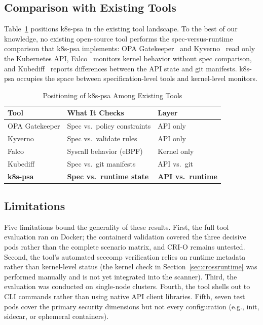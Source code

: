 \documentclass[sigconf]{acmart}
\begin{document}
\subsection{Comparison with Existing Tools}

Table~\ref{tab:tools} positions k8s-psa in the existing tool landscape. To the best of our knowledge, no existing open-source tool performs the spec-versus-runtime comparison that k8s-psa implements: OPA Gatekeeper~\cite{gatekeeper2024} and Kyverno~\cite{kyverno2024} read only the Kubernetes API, Falco~\cite{falco2024} monitors kernel behavior without spec comparison, and Kubediff~\cite{kubediff2020} reports differences between the API state and git manifests. k8s-psa occupies the space between specification-level tools and kernel-level monitors.

\begin{table}[htbp]
\caption{Positioning of k8s-psa Among Existing Tools}
\label{tab:tools}
\centering
\begin{tabular}{lll}
\toprule
\textbf{Tool} & \textbf{What It Checks} & \textbf{Layer} \\
\midrule
OPA Gatekeeper & Spec vs.\ policy constraints & API only \\
Kyverno        & Spec vs.\ validate rules & API only \\
Falco          & Syscall behavior (eBPF) & Kernel only \\
Kubediff       & Spec vs.\ git manifests & API vs.\ git \\
\textbf{k8s-psa} & \textbf{Spec vs.\ runtime state} & \textbf{API vs.\ runtime} \\
\bottomrule
\end{tabular}
\end{table}

\subsection{Limitations}

Five limitations bound the generality of these results. First, the full tool evaluation ran on Docker; the containerd validation covered the three decisive pods rather than the complete scenario matrix, and CRI-O remains untested. Second, the tool's automated seccomp verification relies on runtime metadata rather than kernel-level status (the kernel check in Section~\ref{sec:crossruntime} was performed manually and is not yet integrated into the scanner). Third, the evaluation was conducted on single-node clusters. Fourth, the tool shells out to CLI commands rather than using native API client libraries. Fifth, seven test pods cover the primary security dimensions but not every configuration (e.g., init, sidecar, or ephemeral containers).
\end{document}
